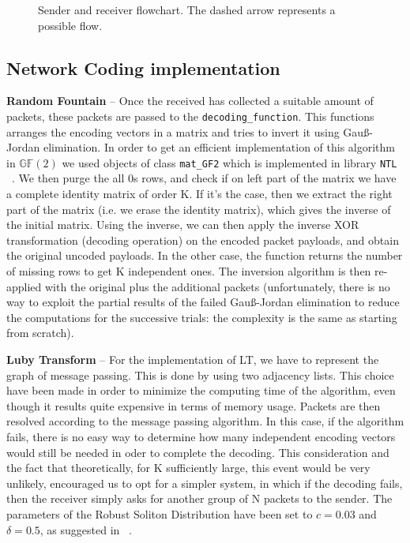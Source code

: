 \begin{sidewaysfigure}
\begin{subfigure}{0.5\hsize}
\end{subfigure}

\caption{Sender and receiver flowchart. The dashed arrow represents a possible flow.}
\label{fig:flowchart}
\end{sidewaysfigure}

\subsection{Network Coding implementation}
\textbf{Random Fountain} -- Once the received has collected a suitable amount of packets, these packets are passed to the \texttt{decoding\_function}. This functions arranges the encoding vectors in a matrix and tries to invert it using Gau{\ss}-Jordan elimination. In order to get an efficient implementation of this algorithm in $\mathds{G}\mathds{F}(2)$ we used objects of class \texttt{mat\_GF2} which is implemented in library \texttt{NTL} ~\cite{NTL}. We then purge the all 0s rows, and check if on left part of the matrix we have a complete identity matrix of order K. If it's the case, then we extract the right part of the matrix  (i.e. we erase the identity matrix), which gives the inverse of the initial matrix. Using the inverse, we can then apply the inverse XOR transformation (decoding operation) on the encoded packet payloads, and obtain the original uncoded payloads. In the other case, the function returns the number of missing rows to get K independent ones. The inversion algorithm is then re-applied with the original plus the additional packets (unfortunately, there is no way to exploit the partial results of the failed Gau{\ss}-Jordan elimination to reduce the computations for the successive trials: the complexity is the same as starting from scratch).

\textbf{Luby Transform} -- For the implementation of LT, we have to represent the graph of message passing. This is done by using two adjacency lists. This choice have been made in order to minimize the computing time of the algorithm, even though it results quite expensive in terms of memory usage. Packets are then resolved according to the message passing algorithm. In this case, if the algorithm fails, there is no easy way to determine how many independent encoding vectors would still be needed in oder to complete the decoding. This consideration and the fact that theoretically, for K sufficiently large, this event would be very unlikely, encouraged us to opt for a simpler system, in which if the decoding fails, then the receiver simply asks for another group of N packets to the sender. The parameters of the Robust Soliton Distribution have been set to $c=0.03$ and $\delta=0.5$, as suggested in ~\cite{RSD}.

